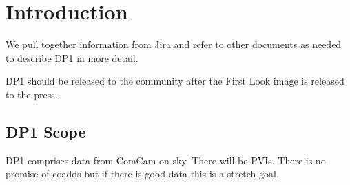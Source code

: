 \section{Introduction} \label{sec:intro}

We pull together information from Jira and refer to other documents as needed to describe DP1 in more detail.

DP1 should be released to the community after the First Look image is released to the press.


\subsection{DP1 Scope}
DP1 comprises data from ComCam on sky.
There will be PVIs.
There is no promise of coadds but if there is good data this is a stretch goal.

